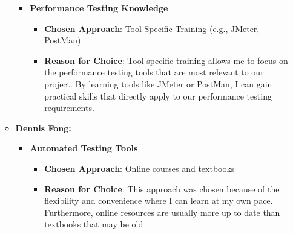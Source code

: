\documentclass[12pt, titlepage]{article}
\begin{document}
\begin{enumerate}
\begin{itemize}
\begin{itemize}
        \item \textbf{Performance Testing Knowledge}  
        \begin{itemize}
            \item \textbf{Chosen Approach}: Tool-Specific Training (e.g., JMeter, PostMan)
            \item \textbf{Reason for Choice}: Tool-specific training allows me to focus on the performance testing 
            tools that are most relevant to our project. By learning tools like JMeter or PostMan, I can gain practical 
            skills that directly apply to our performance testing requirements.
        \end{itemize}
    \end{itemize}
    \item \textbf{Dennis Fong:}
    \begin{itemize}
      \item \textbf{Automated Testing Tools}
      \begin{itemize}
        \item \textbf{Chosen Approach}: Online courses and textbooks
        \item \textbf{Reason for Choice}: This approach was chosen because of
        the flexibility and convenience where I can learn at my own pace.
        Furthermore, online resources are usually more up to date than textbooks
        that may be old
      \end{itemize}


\end{itemize}
\end{itemize}
\end{enumerate}
\end{document}

